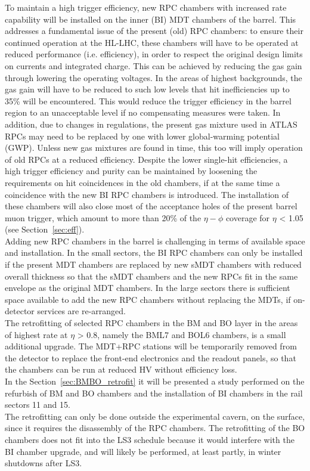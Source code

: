 \noindent To maintain a high trigger efficiency, new RPC chambers with increased rate capability will be installed on the inner (BI) MDT chambers of the barrel. This addresses a fundamental issue
of the present (old) RPC chambers: to ensure their continued operation at the HL-LHC,
these chambers will have to be operated at reduced performance (i.e. efficiency), in order to
respect the original design limits on currents and integrated charge. This can be achieved
by reducing the gas gain through lowering the operating voltages. In the areas of highest
backgrounds, the gas gain will have to be reduced to such low levels that hit inefficiencies
up to 35\% will be encountered. This would reduce the trigger efficiency in the barrel region
to an unacceptable level if no compensating measures were taken. In addition, due
to changes in regulations, the present gas mixture used in ATLAS RPCs may need to be
replaced by one with lower global-warming potential (GWP). Unless new gas mixtures are
found in time, this too will imply operation of old RPCs at a reduced efficiency. Despite
the lower single-hit efficiencies, a high trigger efficiency and purity can be maintained by
loosening the requirements on hit coincidences in the old chambers, if at the same time a
coincidence with the new BI RPC chambers is introduced. The installation of these chambers
will also close most of the acceptance holes of the present barrel muon trigger, which
amount to more than 20\% of the $\eta-\phi$ coverage for $\eta$ < 1.05 (see Section~\ref{sec:eff}).\\

\noindent Adding new RPC chambers in the barrel is challenging in terms of available space and
installation. In the small sectors, the BI RPC chambers can only be installed if the present
MDT chambers are replaced by new sMDT chambers with reduced overall thickness so that
the sMDT chambers and the new RPCs fit in the same envelope as the original MDT chambers.
In the large sectors there is sufficient space available to add the new RPC chambers
without replacing the MDTs, if on-detector services are re-arranged.\\
The retrofitting of selected RPC chambers in the BM and BO layer in the areas of highest
rate at $\eta$ > 0.8, namely the BML7 and BOL6 chambers, is a small additional upgrade. The
MDT+RPC stations will be temporarily removed from the detector to replace the front-end
electronics and the readout panels, so that the chambers can be run at reduced HV without
efficiency loss. \\
In the Section~\ref{sec:BMBO_retrofit} it will be presented a study performed on the refurbish of
BM and BO chambers and the installation of BI chambers in the rail sectors 11 and 15.\\
The retrofitting can only be done outside the experimental cavern, on the
surface, since it requires the disassembly of the RPC chambers. The retrofitting of the BO
chambers does not fit into the LS3 schedule because it would interfere with the BI chamber
upgrade, and will likely be performed, at least partly, in winter shutdowns after LS3.\\


